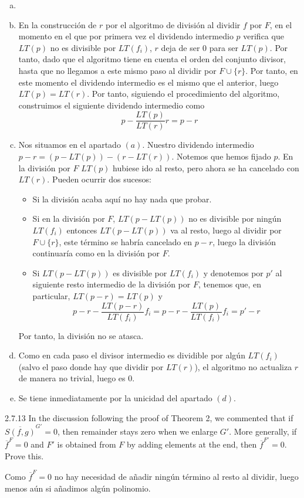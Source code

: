 \documentclass[twoside]{article}
\begin{document}
\begin{solucion}
\begin{enumerate}[a.]
\item[]
\item En la construcción de $r$ por el algoritmo de división al dividir $f$ por $F$, en el momento en el que por primera vez el dividendo intermedio $p$ verifica que $LT(p)$ no es divisible por $LT(f_i)$, $r$ deja de ser $0$ para ser $LT(p)$.  Por tanto, dado que el algoritmo tiene en cuenta el orden del conjunto divisor, hasta que no llegamos a este mismo paso al dividir por $F\cup\{r\}$. Por tanto, en este momento el dividendo intermedio es el mismo que el anterior, luego $LT(p)=LT(r)$. Por tanto, siguiendo el procedimiento del algoritmo, construimos el siguiente dividendo intermedio como 
$$
p-\frac{LT(p)}{LT(r)}r=p-r
$$
\item Nos situamos en el apartado $(a)$. Nuestro dividendo intermedio $p-r = (p-LT(p))-(r-LT(r))$. Notemos que hemos fijado $p$. En la división por $F$  $LT(p)$ hubiese ido al resto, pero ahora se ha cancelado con $LT(r)$. Pueden ocurrir dos sucesos:
\begin{itemize}
\item Si la división acaba aquí no hay nada que probar.
\item Si en la división por $F$, $LT(p-LT(p))$ no es divisible por ningún $LT(f_i)$ entonces $LT(p-LT(p))$ va al resto, luego  al dividir por $F\cup\{r\}$, este término se habría cancelado en $p-r$, luego la división continuaría como en la división por $F$.
\item Si $LT(p-LT(p))$ es divisible por $LT(f_i)$ y denotemos por $p'$ al siguiente resto intermedio de la división por $F$, tenemos que, en particular, $LT(p-r)=LT(p)$ y
$$
p - r - \frac{LT(p-r)}{LT(f_i)}f_i =p - r - \frac{LT(p)}{LT(f_i)}f_i= p'-r
$$
\end{itemize}
Por tanto, la división no se atasca. 
\item Como en cada paso el divisor intermedio es dividible por algún $LT(f_i)$ (salvo el paso donde hay que dividir por $LT(r)$), el algoritmo no actualiza $r$ de manera no trivial, luego es $0$.
\item Se tiene inmediatamente por la unicidad del apartado $(d)$.
\end{enumerate}
\end{solucion}

\newpage

\begin{ejercicio}{2.7.13}
In the discussion following the proof of Theorem 2, we commented that if $\overline{S( f , g)}^{G'} = 0$,
then remainder stays zero when we enlarge $G'$. More generally, if $\overline{f}^F = 0$ and $F'$ is
obtained from $F$ by adding elements at the end, then $\overline{f}^{F'} = 0$. Prove this.
\end{ejercicio}
\begin{solucion}
Como $\overline{f}^F = 0$ no hay necesidad de añadir ningún término al resto al dividir, luego menos aún si añadimos algún polinomio.
\end{solucion}
\end{document}
